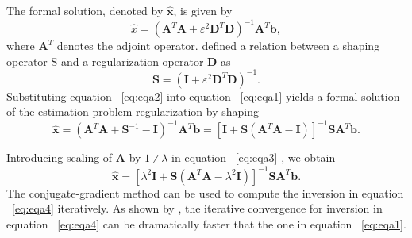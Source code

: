 The formal solution, denoted by $\hat{\mathbf{x}}$, is given by
      \begin{equation}
          \hat{x}=\left( \mathbf{A}^{T}\mathbf{A}+\varepsilon ^{2}\mathbf{D}^{T}\mathbf{D}\right)^{-1}\mathbf{A}^{T}\mathbf{b},
        \label{eq:eqa1}
      \end{equation}
where $\mathbf{A}^{T}$ denotes the adjoint operator. \cite{Fomel2007b} defined a
relation between a shaping operator S and a regularization operator
$\mathbf{D}$ as
      \begin{equation}
          \mathbf{S}=\left(\mathbf{I}+\varepsilon ^{2}\mathbf{D}^{T}\mathbf{D}\right)^{-1}.
        \label{eq:eqa2}
      \end{equation}
Substituting equation  ~\ref{eq:eqa2} into equation  ~\ref{eq:eqa1} yields a formal
solution of the estimation problem regularization by shaping
      \begin{equation}
          \mathbf{\hat{x}}=\left(\mathbf{A}^{T}\mathbf{A}+\mathbf{S}^{-1} -\mathbf{I}\right)^{-1}\mathbf{A}^{T}\mathbf{b}=\left[\mathbf{I}+\mathbf{S}\left(\mathbf{A}^{T}\mathbf{A}-\mathbf{I}\right)\right]^{-1}\mathbf{S}\mathbf{A}^{T}\mathbf{b}.
        \label{eq:eqa3}
      \end{equation}

Introducing scaling of $\mathbf{A}$ by $1∕λ$ in equation ~\ref{eq:eqa3} , we obtain
      \begin{equation}
          \hat{\mathbf{x}}=\left[\lambda ^{2}\mathbf{I}+\mathbf{S}\left(\mathbf{A}^{T}\mathbf{A}-\lambda ^{2}\mathbf{I}\right)\right]^{-1}\mathbf{S}\mathbf{A}^{T}\mathbf{b}.
        \label{eq:eqa4}
      \end{equation}
The conjugate-gradient method can be used to compute the inversion
in equation ~\ref{eq:eqa4} iteratively. As shown by \cite{Fomel2009}, the
iterative convergence for inversion in equation ~\ref{eq:eqa4} can be dramatically
faster that the one in equation ~\ref{eq:eqa1}.

